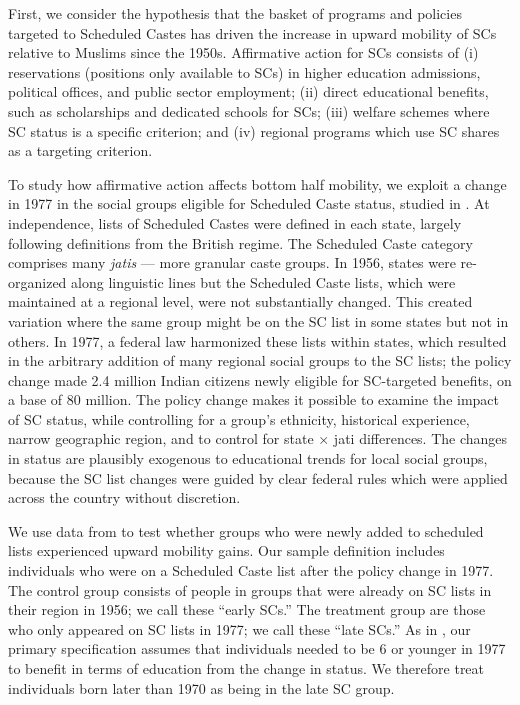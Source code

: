 \documentclass[12pt,letterpaper]{article}
\numberwithin{equation}{section}
\begin{document}
First, we consider the hypothesis that the basket of programs and policies targeted to Scheduled Castes has driven the increase in upward mobility of SCs relative to Muslims since the 1950s. Affirmative action for SCs consists of (i) reservations (positions only available to SCs) in higher education admissions, political offices, and public sector employment; (ii) direct educational benefits, such as scholarships and dedicated schools for SCs; (iii) welfare schemes where SC status is a specific criterion; and (iv) regional programs which use SC shares as a targeting criterion.

To study how affirmative action affects bottom half mobility, we exploit a change in 1977 in the social groups eligible for Scheduled Caste status, studied in . At independence, lists of Scheduled Castes were defined in each state, largely following definitions from the British regime. The Scheduled Caste category comprises many  \textit{jatis} --- more granular caste groups. In 1956, states were re-organized along linguistic lines but the Scheduled Caste lists, which were maintained at a regional level, were not substantially changed. This created variation where the same group might be on the SC list in some states but not in others. In 1977, a federal law harmonized these lists within states, which resulted in the arbitrary addition of many regional social groups to the SC lists; the policy change made 2.4 million Indian citizens newly eligible for SC-targeted benefits, on a base of 80 million. The policy change makes it possible to examine the impact of SC status, while controlling for a group's ethnicity, historical experience, narrow geographic region, and to control for state $\times$ jati differences. The changes in status are plausibly exogenous to educational trends for local social groups, because the SC list changes were guided by clear federal rules which were applied across the country without discretion.

We use data from  to test whether groups who were newly added to scheduled lists experienced upward mobility gains. Our sample definition includes individuals who were on a Scheduled Caste list after the policy change in 1977. The control group consists of people in groups that were already on SC lists in their region in 1956; we call these ``early SCs.'' The treatment group are those who only appeared on SC lists in 1977; we call these ``late SCs.'' As in , our primary specification assumes that individuals needed to be 6 or younger in 1977 to benefit in terms of education from the change in status. We therefore treat individuals born later than 1970 as being in the late SC group.
\end{document}
